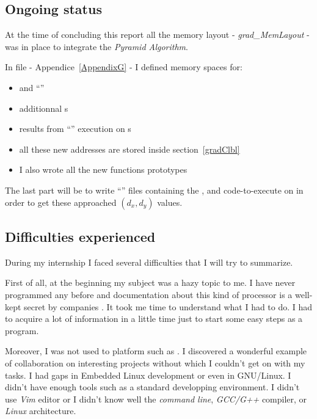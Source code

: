 \subsection{Ongoing status}

At the time of concluding this report all the memory layout - \emph{grad\_MemLayout} - was in place to integrate the \emph{Pyramid Algorithm}.

In  file - Appendice~\ref{AppendixG} - I defined \ram{} memory spaces for:
\begin{itemize}
	\item {} and  \enquote{}
	\item additionnal \uni{}s
	\item results from \enquote{} execution on \qpu{}s
	\item all these new addresses are stored inside  section~\ref{gradClbl}
	\item I also wrote all the new functions prototypes
\end{itemize}

The last part will be to write \enquote{} files containing the ,  and  code-to-execute on \vc{} in order to get these approached $(d_{x},d_{y})$ values.

\subsection{Difficulties experienced}

During my internship I faced several difficulties that I will try to summarize.

First of all, at the beginning my subject was a hazy topic to me. I have never programmed any  before and documentation about this kind of processor is a well-kept secret by companies . It took me time to understand what I had to do. I had to acquire a lot of information in a little time just to start some easy steps as a  program.

Moreover, I was not used to platform such as . I discovered a wonderful example of collaboration on interesting projects without which I couldn't get on with my tasks. I had gaps in Embedded Linux development or even in GNU/Linux. I didn't have enough tools such as a standard developping environment. I didn't use \emph{Vim} editor or I didn't know well the \emph{command line}, \emph{GCC/G++} compiler, or \emph{Linux} architecture.

